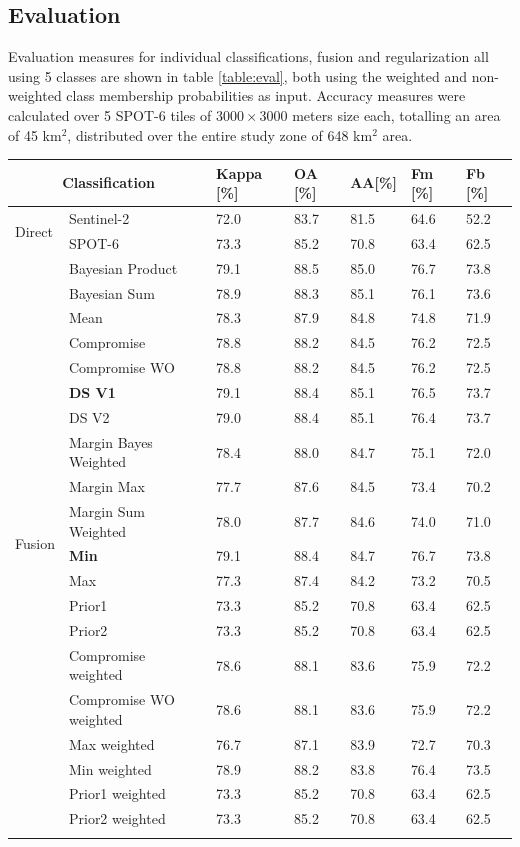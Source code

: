 \documentclass[10pt]{article}
\begin{document}
\subsection{Evaluation}
Evaluation measures for individual classifications, fusion and regularization all using 5 classes are shown in table \ref{table:eval}, both using the weighted and non-weighted class membership probabilities as input. Accuracy measures were calculated over 5 SPOT-6 tiles of $3000\times3000$ meters size each, totalling an area of 45 km$^2$, distributed over the entire study zone of 648 km$^2$ area.
\begin{table}[H]
\centering
\begin{tabular}{p{1.8cm}llllll}\toprule
\multicolumn{2}{c}{\textbf{Classification}}& \textbf{Kappa} [\%] & \textbf{OA} [\%] & \textbf{AA}[\%] & \textbf{Fm} [\%] & \textbf{Fb} [\%]\\\hline
\multirow{2}{*}{Direct}& Sentinel-2 & 72.0 & 83.7 & 81.5 & 64.6 & 52.2 \\
& SPOT-6 & 73.3 & 85.2 & 70.8 & 63.4 & 62.5 \\\hline

\multirow{20}{*}{Fusion}& Bayesian Product & 79.1 & 88.5 & 85.0 & 76.7 & 73.8 \\
& Bayesian Sum & 78.9 & 88.3 & 85.1 & 76.1 & 73.6 \\
& Mean  & 78.3 & 87.9 & 84.8 & 74.8 & 71.9 \\
& Compromise & 78.8 & 88.2 & 84.5 & 76.2 & 72.5 \\
& Compromise WO & 78.8 & 88.2 & 84.5 & 76.2 & 72.5 \\
& \textbf{DS V1} & 79.1 & 88.4 & 85.1 & 76.5 & 73.7 \\
& DS V2 & 79.0 & 88.4 & 85.1 & 76.4 & 73.7 \\
& Margin Bayes Weighted  & 78.4 & 88.0 & 84.7 & 75.1 & 72.0 \\
& Margin Max & 77.7 & 87.6 & 84.5 & 73.4 & 70.2 \\
& Margin Sum Weighted & 78.0 & 87.7 & 84.6 & 74.0 & 71.0 \\
& \textbf{Min} & 79.1 & 88.4 & 84.7 & 76.7 & 73.8 \\
& Max & 77.3 & 87.4 & 84.2 & 73.2 & 70.5 \\
& Prior1 & 73.3 & 85.2 & 70.8 & 63.4 & 62.5 \\
& Prior2 & 73.3 & 85.2 & 70.8 & 63.4 & 62.5 \\
& Compromise weighted & 78.6 & 88.1 & 83.6 & 75.9 & 72.2 \\
& Compromise WO weighted & 78.6 & 88.1 & 83.6 & 75.9 & 72.2 \\
& Max weighted & 76.7 & 87.1 & 83.9 & 72.7 & 70.3 \\
& Min weighted & 78.9 & 88.2 & 83.8 & 76.4 & 73.5 \\
& Prior1 weighted & 73.3 & 85.2 & 70.8 & 63.4 & 62.5 \\
& Prior2 weighted & 73.3 & 85.2 & 70.8 & 63.4 & 62.5 \\\\\hline


\end{tabular}
\end{table}
\end{document}
